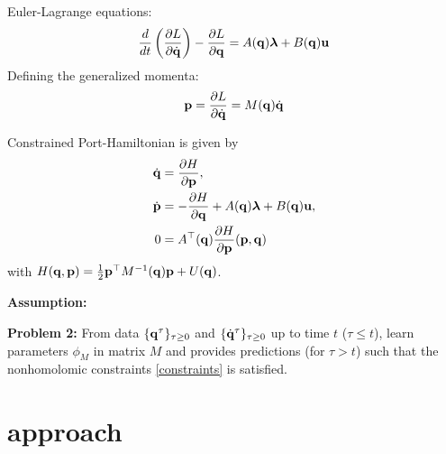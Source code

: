 \documentclass[letterpaper, 10 pt, conference]{ieeeconf}
\begin{document}
Euler-Lagrange equations:
\begin{align}
    \frac{d}{dt}\left(\frac{{\partial} L}{{\partial} \dot{{\mathbf q}}}\right) - \frac{{\partial} L}{{\partial} {\mathbf q}} = A({\mathbf q}) \boldsymbol\lambda + B({\mathbf q}) {\mathbf u}
\end{align}
Defining the generalized momenta:
\begin{align}
    {\mathbf p} = \frac{{\partial} L}{{\partial} \dot {{\mathbf q}}} = M({\mathbf q})\dot {{\mathbf q}}
    \label{constraints}
\end{align}


Constrained Port-Hamiltonian is given by
\begin{align}
    \dot{{\mathbf q}} &= \frac{{\partial} H}{{\partial} {\mathbf p}},
    \\
    \dot{{\mathbf p}} & = -\frac{{\partial} H}{{\partial} {\mathbf q}} + A({\mathbf q}) \boldsymbol\lambda + B({\mathbf q}) {\mathbf u},
    \\
    0 &= A^\top({\mathbf q}) \frac{{\partial} H}{{\partial}{\mathbf p}}({\mathbf p},{\mathbf q})
\end{align}
with $H({\mathbf q},{\mathbf p}) = \frac{1}{2} {\mathbf p}^\top M^{-1}({\mathbf q}) {\mathbf p} + U({\mathbf q})$.

{\bf Assumption:} 

{\bf Problem 2:} From data $\{{\mathbf q}^\tau\}_{\tau\geq 0}$ and $\{\dot{{\mathbf q}}^\tau\}_{\tau\geq 0}$ up to time $t$ ($\tau \leq t$), 
learn parameters $\phi_M$ in matrix $M$ and provides predictions (for $\tau > t$) such that the nonhomolomic constraints \eqref{constraints} is satisfied.

\section{approach}



\end{document}
